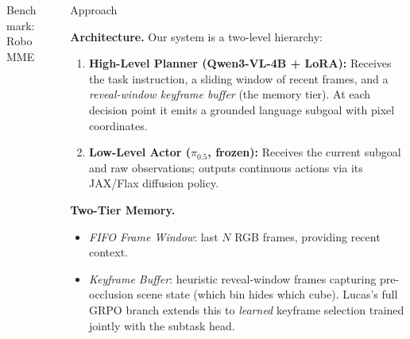 \documentclass[final]{beamer}
\newlength{\sepwidth}
\newlength{\colwidth}
\newcommand{\separatorcolumn}{\begin{column}{\sepwidth}\end{column}}
\begin{document}
\begin{frame}[t]
\begin{columns}[t]
\begin{column}{\colwidth}
\begin{block}{Benchmark: RoboMME}
  \end{block}

\end{column}

\separatorcolumn

\begin{column}{\colwidth}

  \begin{block}{Approach}

    \textbf{Architecture.} Our system is a two-level hierarchy:

    \begin{enumerate}
      \item \textbf{High-Level Planner (Qwen3-VL-4B + LoRA):} Receives the task instruction, a sliding window of recent frames, and a \textit{reveal-window keyframe buffer} (the memory tier). At each decision point it emits a grounded language subgoal with pixel coordinates.
      \item \textbf{Low-Level Actor ($\pi_{0.5}$, frozen):} Receives the current subgoal and raw observations; outputs continuous actions via its JAX/Flax diffusion policy.
    \end{enumerate}

    \vspace{0.5em}
    \textbf{Two-Tier Memory.}
    \begin{itemize}
      \item \textit{FIFO Frame Window}: last $N$ RGB frames, providing recent context.
      \item \textit{Keyframe Buffer}: heuristic reveal-window frames capturing pre-occlusion scene state (which bin hides which cube). Lucas's full GRPO branch extends this to \textit{learned} keyframe selection trained jointly with the subtask head.
    \end{itemize}


\end{block}
\end{column}
\end{columns}
\end{frame}
\end{document}

